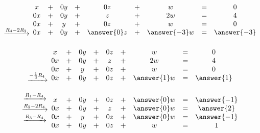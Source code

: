 \documentclass{ximera}
\begin{document}
\begin{exploration}
$$\begin{array}{c}
\\
\\
 \\
\xrightarrow{R_4-2R_2}\\
 \end{array}
\begin{matrix}
      x &+ &0y&+&0z&+&w&= &0 \\
	 0x& +&0y&+&z&+&2w&=&4\\
     0x& +&y&+&0z&+&w&=&0\\
     0x&+&0y&+&\answer{0}z&+&\answer{-3}w&=&\answer{-3}
    \end{matrix}$$


$$\begin{array}{c}
\\
 \\
 \\
\xrightarrow{-\frac{1}{3}R_4}\\
 \end{array}
\begin{matrix}
      x &+ &0y&+&0z&+&w&= &0 \\
	 0x& +&0y&+&z&+&2w&=&4\\
     0x& +&y&+&0z&+&w&=&0\\
     0x&+&0y&+&0z&+&\answer{1}w&=&\answer{1}
    \end{matrix}$$
    

$$
\begin{array}{c}
 \xrightarrow{R_1-R_4}\\
 \xrightarrow{R_2-2R_4}\\
\xrightarrow{R_3-R_4}\\
\\
 \end{array}
\begin{matrix}
      x &+ &0y&+&0z&+&\answer{0}w&= &\answer{-1} \\
	 0x& +&0y&+&z&+&\answer{0}w&=&\answer{2}\\
     0x& +&y&+&0z&+&\answer{0}w&=&\answer{-1}\\
     0x&+&0y&+&0z&+&w&=&1
    \end{matrix}$$
    


\end{exploration}
\end{document}
